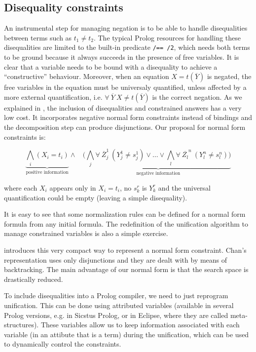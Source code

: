 \documentclass{llncs}
\begin{document}
\subsection{Disequality constraints}
\label{disequality}

An instrumental step for managing negation is to be able to handle
disequalities between terms such as $t_1 \neq t_2$.  The typical
Prolog resources for handling these disequalities are limited to the
built-in predicate {\tt /== /2}, which needs both terms to be ground
because it always succeeds in the presence of free variables.  It is
clear that a variable needs to be bound with a disequality to achieve
a ``constructive'' behaviour.  Moreover, when an equation $X =
t(\overline{Y})$ is negated, the free variables in the equation must
be universaly quantified, unless affected by a more external
quantification, i.e. $\forall~ \overline{Y}~X \neq t(\overline{Y})$ is
the correct negation.  As we explained in \cite{SusanaPADL2000}, the
inclusion of disequalities and constrained answers has a very low
cost. It incorporates negative normal form constraints instead of
bindings and the decomposition step can produce disjunctions. Our
proposal for normal form constraints is:

\[ \underbrace{\bigwedge_i (X_i = t_i)}_{\mbox{positive information}} \wedge~~~~ ( \underbrace{\bigwedge_j \forall~ \overline{Z}_j^1~(Y_j^1 \neq s_j^1) \vee \ldots \vee \bigwedge_l \forall~ \overline{Z_l}^n~(Y_l^n \neq s_l^n) ) }_{\mbox{negative information}} \]

\noindent
where each $X_i$ appears only in $X_i = t_i$, no $s_k^r$ is $Y_k^r$
and the universal quantification could be empty (leaving a simple
disequality).

It is easy to see that some normalization rules can be defined for a
normal form formula from any initial formula. The redefinition of the
unification algorithm to manage constrained variables is also a simple
exercise.

\cite{Moreno1} introduces this very compact way to represent a normal
form constraint.  Chan's representation uses only disjunctions and
they are dealt with by means of backtracking. The main advantage of our
normal form is that the search space is drastically reduced.

To include disequalities into a Prolog compiler, we need to just
reprogram unification. This can be done using attributed variables
\cite{Carlsson} (available in several Prolog versions, e.g. in Sicstus
Prolog, or in Eclipse, where they are called meta-structures). These
variables allow us to keep information associated with each variable
(in an attibute that is a term) during the unification, which can be
used to dynamically control the constraints.
\end{document}

